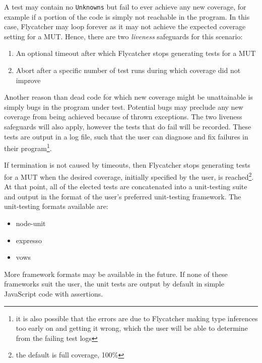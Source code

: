 A test may contain no \texttt{Unknowns} but fail to ever achieve any new coverage, for example if a portion of the code is simply not reachable in the program. In this case, \textsf{Flycatcher} may loop forever as it may not achieve the expected coverage setting for a MUT. Hence, there are two \emph{liveness} safeguards for this scenario:

\begin{enumerate}
   \item An optional timeout after which \textsf{Flycatcher} stops generating tests for a MUT
   \item Abort after a specific number of test runs during which coverage did not improve
\end{enumerate}

Another reason than dead code for which new coverage might be unattainable is simply bugs in the program under test. Potential bugs may preclude any new coverage from being achieved because of thrown exceptions. The two liveness safeguards will also apply, however the tests that do fail will be recorded. These tests are output in a log file, such that the user can diagnose and fix failures in their program\footnote{it is also possible that the errors are due to \textsf{Flycatcher} making type inferences too early on and getting it wrong, which the user will be able to determine from the failing test logs}.

If termination is not caused by timeouts, then \textsf{Flycatcher} stops generating tests for a MUT when the desired coverage, initially specified by the user, is reached\footnote{the default is full coverage, 100\%}. At that point, all of the elected tests are concatenated into a unit-testing suite and output in the format of the user's preferred unit-testing framework. The unit-testing formats available are:

\begin{itemize}
   \item node-unit
   \item expresso
   \item vows
\end{itemize}

More framework formats may be available in the future. If none of these frameworks suit the user, the unit tests are output by default in simple JavaScript code with assertions.